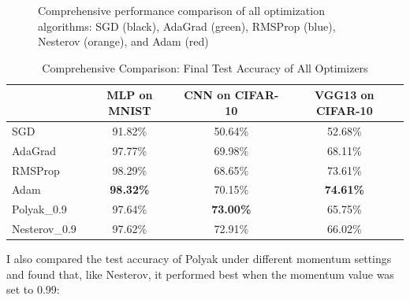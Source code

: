 \documentclass[12pt]{article}
\begin{document}
\begin{figure}[htbp]
    \caption{Comprehensive performance comparison of all optimization algorithms: SGD (black), AdaGrad (green), RMSProp (blue), Nesterov (orange), and Adam (red)}
    \label{fig:comprehensive_comparison_final}
\end{figure}


\begin{table}[H]
\centering
\caption{Comprehensive Comparison: Final Test Accuracy of All Optimizers}
\label{tab:comprehensive_comparison}
\begin{tabular}{|l|c|c|c|}
\hline
             & MLP on MNIST & CNN on CIFAR-10 & VGG13 on CIFAR-10 \\ \hline
SGD          & 91.82\%      & 50.64\%         & 52.68\%           \\ \hline
AdaGrad      & 97.77\%      & 69.98\%         & 68.11\%           \\ \hline
RMSProp      & 98.29\%      & 68.65\%         & 73.61\%           \\ \hline
Adam         & \textbf{98.32\%} & 70.15\%         & \textbf{74.61\%}    \\ \hline
Polyak\_0.9   & 97.64\%      & \textbf{73.00\%}  & 65.75\%           \\ \hline
Nesterov\_0.9 & 97.62\%      & 72.91\%         & 66.02\%           \\ \hline
\end{tabular}
\end{table}

I also compared the test accuracy of Polyak under different momentum settings and found that, like Nesterov, it performed best when the momentum value was set to 0.99:
\end{document}

